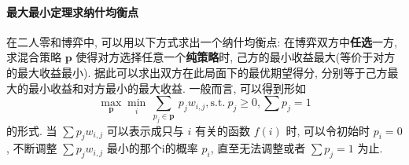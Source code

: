 \paragraph{最大最小定理求纳什均衡点} 在二人零和博弈中,
可以用以下方式求出一个纳什均衡点:
在博弈双方中\textbf{任选}一方,
求混合策略 $\mathbf{p}$ 使得对方选择任意一个\textbf{纯策略}时,
己方的最小收益最大(等价于对方的最大收益最小).
据此可以求出双方在此局面下的最优期望得分,
分别等于己方最大的最小收益和对方最小的最大收益. 一般而言, 可以得到形如
$$\max_{\mathbf{p}} \min_i\ \sum_{p_j\in \mathbf{p}}\ p_jw_{i,j}, \mathrm{s.t. } \ p_j\ge 0, \sum p_j=1 $$
的形式. 当 $\sum p_jw_{i,j}$ 可以表示成只与 $i$ 有关的函数 $f(i)$ 时, 可以令初始时 $p_i=0$, 不断调整 $\sum p_jw_{i,j}$ 最小的那个i的概率 $p_i$, 直至无法调整或者 $\sum p_j=1$ 为止.
